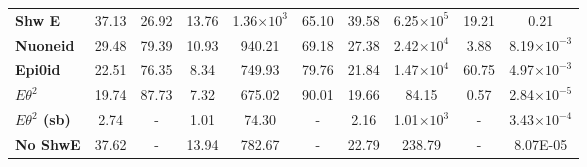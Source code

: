 \begin{table}[!hb]
\begin{tabular}{|l|ccc|ccc|ccc|}
\textbf{Shw E}      & 37.13             & 26.92                                                              & 13.76                                     & 1.36$\times 10^3$           & 65.10                                                               & 39.58                                      & 6.25$\times 10^5$          & 19.21                                                              & 0.21                                      \\
\textbf{Nuoneid}      & 29.48             & 79.39                                                              & 10.93                                     & 940.21             & 69.18                                                               & 27.38                                      & 2.42$\times 10^4$ & 3.88                                                               & 8.19$\times 10^{-3}$                                  \\
\textbf{Epi0id}       & 22.51             & 76.35                                                              & 8.34                                      & 749.93             & 79.76                                                               & 21.84                                      & 1.47$\times 10^4$ & 60.75                                                              & 4.97$\times 10^{-3}$                                  \\
\rowcolor[HTML]{67FD9A}
\textbf{$E\theta^2$}      & 19.74             & 87.73                                                              & 7.32                                      & 675.02             & 90.01                                                               & 19.66                                      & 84.15             & 0.57                                                               & 2.84$\times 10^{-5}$                                 \\\hline\hline
\textbf{$E\theta^2$ (sb)}  & 2.74              & -                                                              & 1.01                                      & 74.30              & -                                                               & 2.16                                       & 1.01$\times 10^3$          & - & 3.43$\times 10^{-4}$                                  \\\hline\hline
\textbf{No ShwE}  & 37.62             & -                                                           & 13.94                                     & 782.67             & -                                                            & 22.79                                      & 238.79            & -                                                              & 8.07E-05   \\\hline
\end{tabular}
\label{tab:CutflowTableSignal}
\end{table}


